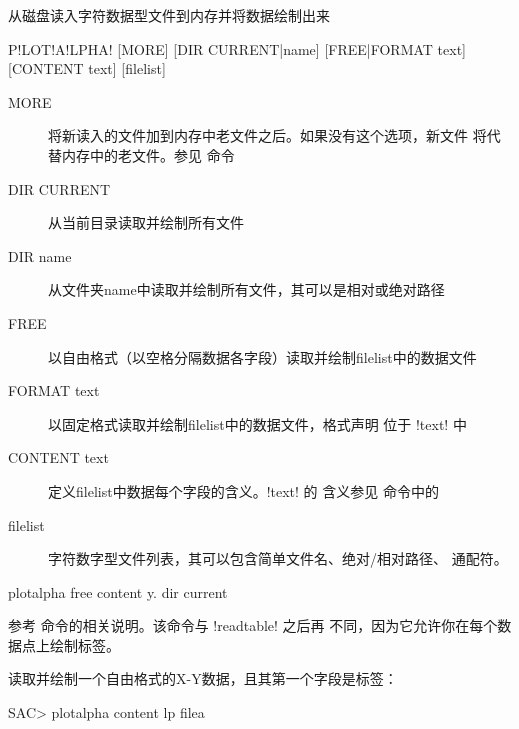 \label{cmd:plotalpha}

从磁盘读入字符数据型文件到内存并将数据绘制出来

\begin{SACSTX}
P!LOT!A!LPHA! [MORE] [DIR CURRENT|name] [FREE|FORMAT text] [CONTENT text] [filelist]
\end{SACSTX}

\begin{description}
\item [MORE] 将新读入的文件加到内存中老文件之后。如果没有这个选项，新文件
    将代替内存中的老文件。参见  命令
\item [DIR CURRENT] 从当前目录读取并绘制所有文件
\item [DIR name] 从文件夹name中读取并绘制所有文件，其可以是相对或绝对路径
\item [FREE] 以自由格式（以空格分隔数据各字段）读取并绘制filelist中的数据文件
\item [FORMAT text] 以固定格式读取并绘制filelist中的数据文件，格式声明
    位于 !text! 中
\item [CONTENT text] 定义filelist中数据每个字段的含义。!text! 的
    含义参见  命令中的
\item [filelist] 字符数字型文件列表，其可以包含简单文件名、绝对/相对路径、
    通配符。
\end{description}

\begin{SACDFT}
plotalpha free content y. dir current
\end{SACDFT}

参考  命令的相关说明。该命令与 !readtable!
之后再  不同，因为它允许你在每个数据点上绘制标签。

读取并绘制一个自由格式的X-Y数据，且其第一个字段是标签：
\begin{SACCode}
SAC> plotalpha content lp filea
\end{SACCode}
